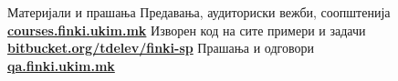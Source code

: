 \begin{frame}{Материјали и прашања}{}
    Предавања, аудиториски вежби, соопштенија\\
    \href{http://courses.finki.ukim.mk/}{\textbf{courses.finki.ukim.mk}}
    \vfill
    Изворен код на сите примери и задачи\\
    \href{http://bitbucket.org/tdelev/finki-sp/}{\textbf{bitbucket.org/tdelev/finki-sp}}
    \vfill
    Прашања и одговори\\
    \href{http://qa.finki.ukim.mk}{\textbf{qa.finki.ukim.mk}}
\end{frame}